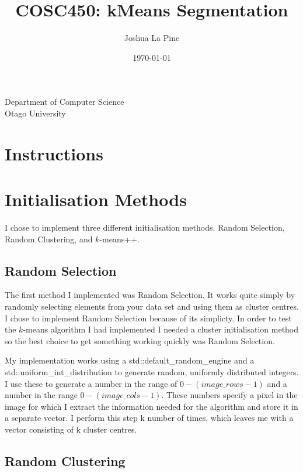 \documentclass{article}
\title{COSC450: kMeans Segmentation} %
\author{Joshua La Pine} %
\date{\today} %
\begin{document}
\maketitle %

\begin{center}
Department of Computer Science \\
Otago University \\

\end{center}
\newpage

\tableofcontents
\newpage

\section{Instructions}

\section{Initialisation Methods}

I chose to implement three different initialisation methods. Random Selection, Random Clustering, and $k$-means++.

\subsection{Random Selection}

The first method I implemented was Random Selection. It works quite simply by randomly selecting elements from your data set and using them as cluster centres. I chose to implement Random Selection because of its simplicty. In order to test the $k$-means algorithm I had implemented I needed a cluster initialisation method so the best choice to get something working quickly was Random Selection. 

My implementation works using a std::default\_random\_engine and a std::uniform\_int\_distribution to generate random, uniformly distributed integers. I use these to generate a number in the range of $0-(image\_rows-1)$ and a number in the range $0-(image\_cols-1)$. These numbers specify a pixel in the image for which I extract the information needed for the algorithm and store it in a separate vector. I perform this step k number of times, which leaves me with a vector consisting of k cluster centres. 

\subsection{Random Clustering}
\end{document}
